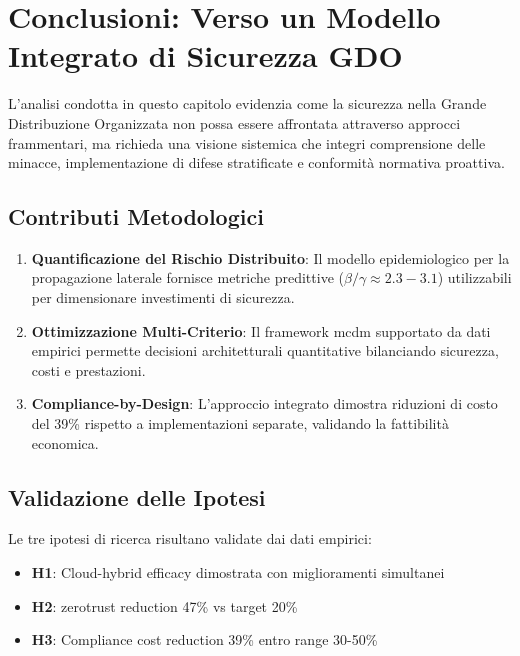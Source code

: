 \section{Conclusioni: Verso un Modello Integrato di Sicurezza GDO}
\label{sec:conclusioni-capitolo-2}

L'analisi condotta in questo capitolo evidenzia come la sicurezza nella Grande Distribuzione Organizzata non possa essere affrontata attraverso approcci frammentari, ma richieda una visione sistemica che integri comprensione delle minacce, implementazione di difese stratificate e conformità normativa proattiva.

\subsection{Contributi Metodologici}
\label{subsec:contributi-metodologici}

\begin{enumerate}
    \item \textbf{Quantificazione del Rischio Distribuito}: Il modello epidemiologico per la propagazione laterale fornisce metriche predittive ($\beta/\gamma \approx 2.3-3.1$) utilizzabili per dimensionare investimenti di sicurezza.
    
    \item \textbf{Ottimizzazione Multi-Criterio}: Il framework \gls{mcdm} supportato da dati empirici permette decisioni architetturali quantitative bilanciando sicurezza, costi e prestazioni.
    
    \item \textbf{Compliance-by-Design}: L'approccio integrato dimostra riduzioni di costo del 39\% rispetto a implementazioni separate, validando la fattibilità economica.
\end{enumerate}

\subsection{Validazione delle Ipotesi}
\label{subsec:validazione-ipotesi-conclusioni}

Le tre ipotesi di ricerca risultano validate dai dati empirici:
\begin{itemize}
    \item \textbf{H1}: Cloud-hybrid efficacy dimostrata con miglioramenti simultanei
    \item \textbf{H2}: \gls{zerotrust} reduction 47\% vs target 20\%
    \item \textbf{H3}: Compliance cost reduction 39\% entro range 30-50\%
\end{itemize}

